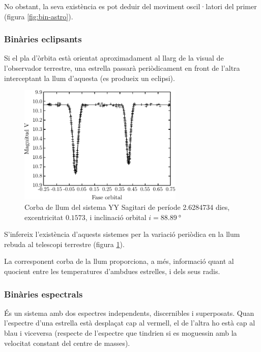 No obstant, la seva existència es pot deduir del moviment oscil·latori del primer (figura \ref{fig:bin-astro}).

\subsubsection*{Binàries eclipsants}
Si el pla d'òrbita està orientat aproximadament al llarg de la visual de l'observador terrestre, una estrella passarà periòdicament en front de l'altra interceptant la llum d'aquesta (es produeix un eclipsi).
\begin{figure}[h]
	\centering
	\includegraphics[width=0.7\textwidth]{./images/5-bin-eclip}
	\caption{Corba de llum del sistema YY Sagitari de període \num{2.6284734} dies, excentricitat $\num{0.1573}$, i inclinació orbital $i = \SI{88.89}{\degree}$}
	\label{fig:bin-eclip}
\end{figure}

S'infereix l'existència d'aquests sistemes per la variació periòdica en la llum rebuda al telescopi terrestre (figura \ref{fig:bin-eclip}).

La corresponent corba de la llum proporciona, a més, informació quant al quocient entre les temperatures d'ambdues estrelles, i dels seus radis.

\subsubsection*{Binàries espectrals}
És un sistema amb dos espectres independents, discernibles i superposats. Quan l'espectre d'una estrella està desplaçat cap al vermell, el de l'altra ho està cap al blau i viceversa (respecte de l'espectre que tindrien si es moguessin amb la velocitat constant del centre de masses).

